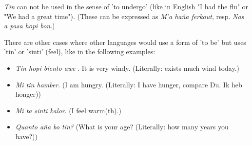 \emph{Tin} can not be used in the sense of 'to undergo'  (like in
English "I had the flu" or "We had a great time"). (These can be
expressed as \emph{M'a haña ferkout},
resp.\emph{ Nos a pasa hopi bon}.)
 
 There are other cases where other languages would use a form of 'to
 be' but \pap{} uses 'tin' or 'sinti' (feel), like in the following examples:

\begin{itemize}
\item \emph{Tin hopi biento awe} . It is very windy. (Literally: exists much
  wind today.)
\item \emph{Mi tin hamber}. (I am hungry. (Literally: I have hunger, compare Du. Ik heb honger))
\item \emph{Mi ta sinti kalor}. (I feel warm(th).)
\item \emph{Quanto aña bo tin?} (What is your age? (Literally: how many years you have?))
\end{itemize}
